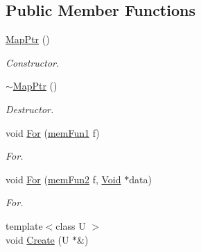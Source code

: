 \subsection*{Public Member Functions}
\begin{DoxyCompactItemize}
\item 
\hypertarget{classMapPtr_af05df5f43282ad0e3b857e7b0e0cfa16}{
\hyperlink{classMapPtr_af05df5f43282ad0e3b857e7b0e0cfa16}{MapPtr} ()}
\label{classMapPtr_af05df5f43282ad0e3b857e7b0e0cfa16}

\begin{DoxyCompactList}\small\item\em Constructor. \item\end{DoxyCompactList}\item 
\hypertarget{classMapPtr_ac23f3b91e42cdee8b6ccd7f88d141afd}{
\hyperlink{classMapPtr_ac23f3b91e42cdee8b6ccd7f88d141afd}{$\sim$MapPtr} ()}
\label{classMapPtr_ac23f3b91e42cdee8b6ccd7f88d141afd}

\begin{DoxyCompactList}\small\item\em Destructor. \item\end{DoxyCompactList}\item 
\hypertarget{classMapPtr_ab21306887abd5920656d73e95ccace12}{
void \hyperlink{classMapPtr_ab21306887abd5920656d73e95ccace12}{For} (\hyperlink{classMapPtr_aa7cb53d536d442c005d3605074cb11b0}{memFun1} f)}
\label{classMapPtr_ab21306887abd5920656d73e95ccace12}

\begin{DoxyCompactList}\small\item\em For. \item\end{DoxyCompactList}\item 
\hypertarget{classMapPtr_a062ad7a5c0af3a66c7e59bad2cd08ed6}{
void \hyperlink{classMapPtr_a062ad7a5c0af3a66c7e59bad2cd08ed6}{For} (\hyperlink{classMapPtr_a51ffcd92e3106c7fca3bbc14c9a62187}{memFun2} f, \hyperlink{structVoid}{Void} $\ast$data)}
\label{classMapPtr_a062ad7a5c0af3a66c7e59bad2cd08ed6}

\begin{DoxyCompactList}\small\item\em For. \item\end{DoxyCompactList}\item 
\hypertarget{classMapPtr_aa339204600c908a0dc2c6c73b9480d0b}{
{\footnotesize template$<$class U $>$ }\\void \hyperlink{classMapPtr_aa339204600c908a0dc2c6c73b9480d0b}{Create} (U $\ast$\&)}
\label{classMapPtr_aa339204600c908a0dc2c6c73b9480d0b}


\end{DoxyCompactItemize}
